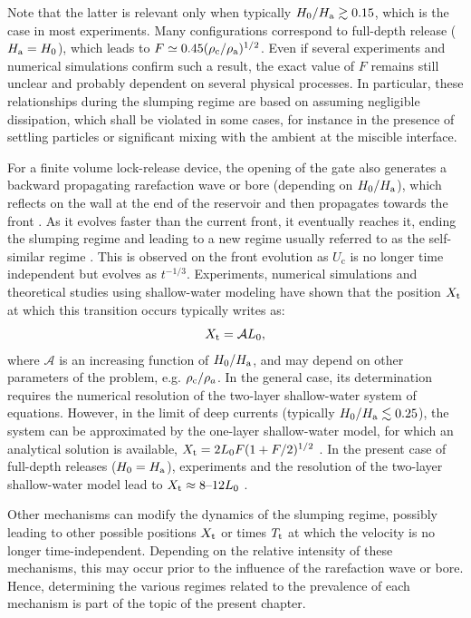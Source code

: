 \documentclass[12pt]{article}
\begin{document}
%
Note that the latter is relevant only when typically $H_0/H_{\text a} \gtrsim 0.15$, which is the case in most experiments. Many configurations correspond to full-depth release ($H_{\text a}=H_0$), which leads to $F \simeq 0.45(\rho_{\text c}/\rho_{\text a})^{1/2}$. Even if several experiments and numerical simulations confirm such a result, the exact value of $F$ remains still unclear and probably dependent on several physical processes. In particular, these relationships during the slumping regime are based on assuming negligible dissipation, which shall be violated in some cases, for instance in the presence of settling particles or significant mixing with the ambient at the miscible interface.

For a finite volume lock-release device, the opening of the gate also generates a backward propagating rarefaction wave or bore (depending on $H_{0}/H_{\rm a}$), which reflects on the wall at the end of the reservoir and then propagates towards the front \citep[e.g.][]{ungarish2020gravity}. As it evolves faster than the current front, it eventually reaches it, ending the slumping regime and leading to a new regime usually referred to as the self-similar regime \citep[e.g.][]{Rottman1983, Hogg2006}. This is observed on the front evolution as $U_{\text{c}}$ is no longer time independent but evolves as $t^{-1/3}$.
%
Experiments, numerical simulations and theoretical studies using shallow-water modeling have shown that the position $X_{\text t}$ at which this transition occurs typically writes as:
\begin{equation}
	\label{eq:Xt_inertial}
	\displaystyle X_{\text t} = \mathcal{A} L_{0},
\end{equation}
where $\mathcal{A}$ is an increasing function of $H_{0}/H_{\rm a}$, and may depend on other parameters of the problem, e.g. $\rho_{\rm c}/\rho_{a}$. In the general case, its determination requires the numerical resolution of the two-layer shallow-water system of equations. However, in the limit of deep currents (typically $H_{0}/H_{\rm a} \lesssim 0.25$), the system can be approximated by the one-layer shallow-water model, for which an analytical solution is available, $X_{\text t} = 2 L_0 F (1 + F/2)^{1/2}$ \citep{Hogg2006}. In the present case of full-depth releases ($H_{0} = H_{\rm a}$), experiments and the resolution of the two-layer shallow-water model lead to $X_{\text t} \approx 8 \text{--} 12 L_{0}$ \citep{Rottman1983, Ungarish2005}.

Other mechanisms can modify the dynamics of the slumping regime, possibly leading to other possible positions $X_{\text t}$ or times $T_{\text t}$ at which the velocity is no longer time-independent. Depending on the relative intensity of these mechanisms, this may occur prior to the influence of the rarefaction wave or bore. Hence, determining the various regimes related to the prevalence of each mechanism is part of the topic of the present chapter.
\end{document}
